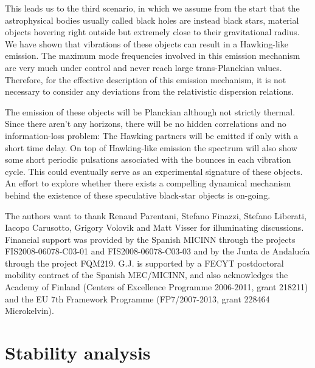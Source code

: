 \documentclass[12pt]{article}
\begin{document}
This leads us to the third scenario, in which we assume from the start that the astrophysical bodies 
usually called black holes are instead black stars, material objects hovering right 
outside but extremely close to their gravitational radius. We have shown that vibrations
of these objects can result in a Hawking-like emission. The maximum mode frequencies 
involved in this emission mechanism are very much under control and never reach large 
trans-Planckian values. Therefore, for the effective description of this
emission mechanism, it is not necessary to consider any deviations from the relativistic
dispersion relations. 

The emission of these objects will be Planckian although not strictly thermal. Since there aren't any horizons, there will be no hidden correlations and no information-loss problem: The 
Hawking partners will be emitted if only with a short time delay. On top of Hawking-like 
emission the spectrum will also show some short periodic pulsations associated with the 
bounces in each vibration cycle. This could eventually serve as an experimental signature of these
objects. An effort to explore whether there exists a compelling dynamical mechanism 
behind the existence  of these speculative black-star objects is on-going.



\acknowledgments

The authors want to thank Renaud Parentani, Stefano Finazzi, Stefano Liberati, Iacopo Carusotto, Grigory Volovik and Matt Visser for illuminating discussions. Financial support was provided by the Spanish MICINN through the
projects FIS2008-06078-C03-01 and FIS2008-06078-C03-03 and by
the Junta de Andaluc\'{\i}a through the project FQM219. 
G.J. is supported by a FECYT postdoctoral mobility contract of the Spanish MEC/MICINN, and also 
acknowledges the Academy of Finland (Centers of Excellence
Programme  2006-2011, grant 218211) and the EU 7th Framework Programme
(FP7/2007-2013,  grant 228464 Microkelvin). 


\appendix

\section{Stability analysis}
\end{document}
